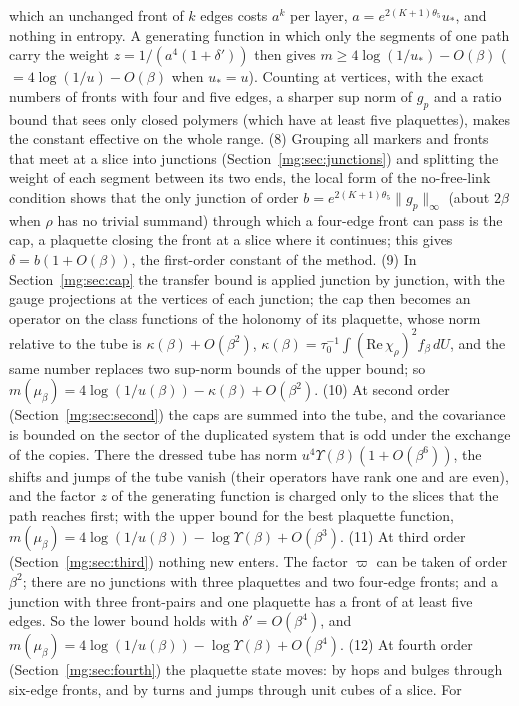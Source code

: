 \documentclass[11pt,a4paper]{article}
\theoremstyle{definition}
\theoremstyle{remark}
\newcommand{\dU}{\,dU}
\newcommand{\norm}[1]{\lVert #1\rVert}
\begin{document}
which an unchanged front of $k$ edges costs $a^k$ per layer, $a=e^{2(K+1)\theta_5}u_*$, and nothing in entropy. A generating function in which only
the segments of one path carry the weight $z=1/(a^4(1+\delta'))$ then gives $m\ge4\log(1/u_*)-O(\beta)$ ($=4\log(1/u)-O(\beta)$ when $u_*=u$).
Counting at vertices, with the exact numbers of fronts with four and five edges, a sharper sup norm of $g_p$ and a ratio bound that sees only closed
polymers (which have at least five plaquettes), makes the constant effective on the whole range. (8) Grouping all markers and fronts that meet at a slice
into junctions (Section~\ref{mg:sec:junctions}) and splitting the weight of each segment between its two ends, the local form of the no-free-link
condition shows that the only junction of order $b=e^{2(K+1)\theta_5}\norm{g_p}_\infty$ (about $2\beta$ when $\rho$ has no trivial summand) through which a
four-edge front can pass is the cap, a plaquette closing the front at a slice where it continues; this gives $\delta=b(1+O(\beta))$, the first-order
constant of the method. (9) In Section~\ref{mg:sec:cap} the transfer bound is applied junction by junction, with the gauge projections at the
vertices of each junction; the cap then becomes an operator on the class functions of the holonomy of its plaquette, whose norm relative to the tube is
$\kappa(\beta)+O(\beta^2)$, $\kappa(\beta)=\tau_0^{-1}\int(\mathrm{Re}\,\chi_\rho)^2f_\beta\dU$, and the same number replaces two sup-norm bounds of the upper
bound; so $m(\mu_\beta)=4\log(1/u(\beta))-\kappa(\beta)+O(\beta^2)$. (10) At second order (Section~\ref{mg:sec:second}) the caps are summed into the tube,
and the covariance is bounded on the sector of the duplicated system that is odd under the exchange of the copies. There the dressed tube has norm
$u^4\Upsilon(\beta)(1+O(\beta^6))$, the shifts and jumps of the tube vanish (their operators have rank one and are even), and the factor $z$ of the
generating function is charged only to the slices that the path reaches first; with the upper bound for the best plaquette function,
$m(\mu_\beta)=4\log(1/u(\beta))-\log\Upsilon(\beta)+O(\beta^3)$. (11) At third order (Section~\ref{mg:sec:third}) nothing new enters. The factor $\varpi$
can be taken of order $\beta^2$; there are no junctions with three plaquettes and two four-edge fronts; and a junction with three front-pairs and one
plaquette has a front of at least five edges. So the lower bound holds with $\delta'=O(\beta^4)$, and $m(\mu_\beta)=4\log(1/u(\beta))-\log\Upsilon(\beta)+O(\beta^4)$. (12) At fourth order
(Section~\ref{mg:sec:fourth}) the plaquette state moves: by hops and bulges through six-edge fronts, and by turns and jumps through unit cubes of a slice. For
\end{document}
